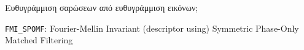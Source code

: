 \begin{frame}{Ευθυγράμμιση σαρώσεων από ευθυγράμμιση εικόνων;}

  {\small
  \texttt{FMI\_SPOMF}: Fourier-Mellin Invariant (descriptor using) Symmetric Phase-Only Matched Filtering
  }

  \begin{figure}
    
  \end{figure}


\end{frame}

